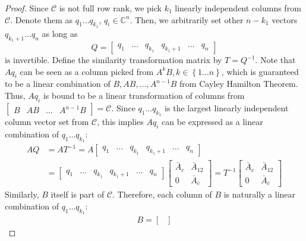 \documentclass[
]{book}
\theoremstyle{definition}
\theoremstyle{definition}
\theoremstyle{definition}
\theoremstyle{definition}
\theoremstyle{remark}
\begin{document}
\begin{proof}
Since \(\mathcal{C}\) is not full row rank, we pick \(k_1\) linearly independent columns from \(\mathcal{C}\). Denote them as \(q_1\dots q_{k_1}\), \(q_i \in \mathbb{C}^n\). Then, we arbitrarily set other \(n-k_1\) vectors \(q_{k_1+1} \dots q_{n}\) as long as
\[
Q = \begin{bmatrix}
   q_1 & \dots & q_{k_1} & q_{k_1+1} & \dots & q_{n} 
\end{bmatrix}
\]
is invertible. Define the similarity transformation matrix by \(T = Q^{-1}\). Note that \(A q_i\) can be seen as a column picked from \(A^{k} B, k \in \left\{1 \dots n\right\}\), which is guaranteed to be a linear combination of \(B, AB, \dots, A^{n-1}B\) from Cayley Hamilton Theorem. Thus, \(A q_i\) is bound to be a linear transformation of columns from \(\begin{bmatrix} B & AB & \dots & A^{n-1} B \end{bmatrix} = \mathcal{C}\). Since \(q_1\dots q_{k_1}\) is the largest linearly independent column vector set from \(\mathcal{C}\), this implies \(A q_i\) can be expressed as a linear combination of \(q_1\dots q_{k_1}\):
\begin{equation*}
   \begin{split}
      A Q & = A T^{-1} = A \begin{bmatrix}
         q_1 & \dots & q_{k_1} & q_{k_1+1} & \dots & q_{n} 
      \end{bmatrix} \\
      & = \begin{bmatrix}
         q_1 & \dots & q_{k_1} & q_{k_1+1} & \dots & q_{n} 
      \end{bmatrix} \begin{bmatrix}
         \bar{A}_c & \bar{A}_{12} \\
         0 & \bar{A}_{\bar{c}} 
      \end{bmatrix} = T^{-1} \begin{bmatrix}
         \bar{A}_c & \bar{A}_{12} \\
         0 & \bar{A}_{\bar{c}} 
      \end{bmatrix}
   \end{split} 
\end{equation*}
Similarly, \(B\) itself is part of \(\mathcal{C}\). Therefore, each column of \(B\) is naturally a linear combination of \(q_1 \dots q_{k_1}\):
\begin{equation*}
   \begin{split}
      B = \begin{bmatrix}

\end{bmatrix}
\end{split}
\end{equation*}
\end{proof}
\end{document}
